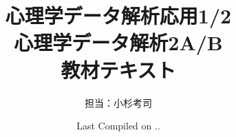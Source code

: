 \documentclass{ltjsbook}
\begin{document}
\VerbatimFootnotes
\title{心理学データ解析応用1/2\\心理学データ解析2A/B\\教材テキスト}
\author{担当：小杉考司}
\date{Last Compiled on \number\year .\number\month .\number\day}
\maketitle
\setcounter{tocdepth}{1}
\tableofcontents
\linenumbers





















% 
% 
% 
% 
% 
% 
% 
% 
% 
\appendix


\nolinenumbers


\printindex
\end{document}
